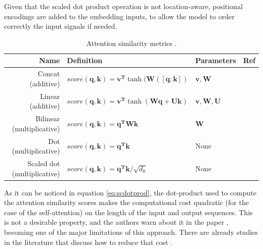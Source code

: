 Given that the scaled dot product operation is not location-aware, positional encodings are added to the embedding inputs, to allow the model to order correctly the input signals if needed.

\begin{table}
\caption{Attention similarity metrics \autocite{uday2019}.}
\footnotesize
\centering
\begin{tabular}{r|lll}
	\toprule
	            Name             &                                           Definition                                            &              Parameters              &         Ref         \\ \midrule
	     Concat (additive)       &     $score(\mathbf{q}, \mathbf{k}) = \mathbf{v^T} \tanh(\mathbf{W}([\mathbf{q};\mathbf{k}])$      &       $\mathbf{v}, \mathbf{W}$       &  \autocite{Luong2015}   \\
	     Linear (additive)       & $score(\mathbf{q}, \mathbf{k}) = \mathbf{v^T} \tanh(\mathbf{W}\mathbf{q} + \mathbf{U}\mathbf{k})$ & $\mathbf{v}, \mathbf{W}, \mathbf{U}$ & \autocite{bahdanau2015} \\
	 Bilinear (multiplicative)   &              $score(\mathbf{q}, \mathbf{k}) =  \mathbf{q^T} \mathbf{W} \mathbf{k}$              &             $\mathbf{W}$             &  \autocite{Luong2015}   \\
	   Dot  (multiplicative)     &                   $score(\mathbf{q}, \mathbf{k}) = \mathbf{q^T}  \mathbf{k}$                    &                 None                 & \autocite{vaswani2017}  \\
	Scaled dot  (multiplicative) &             $score(\mathbf{q}, \mathbf{k}) =  \mathbf{q^T} \mathbf{k} / \sqrt{d_k}$             &                 None                 &  \autocite{Luong2015}   \\ \bottomrule
\end{tabular}
\label{table:attentionsimilarities}
\end{table}

As it can be noticed in equation \ref{eq:scdotprod}, the dot-product used to compute the attention similarity scores makes the computational cost quadratic (for the case of the self-attention) on the length of the input and output sequences. This is not a desirable property, and the authors warn about it in the paper \autocite{vaswani2017}, becoming one of the major limitations of this approach. There are already studies in the literature that discuss how to reduce that cost \autocite{jaegle2021, so2021}.

